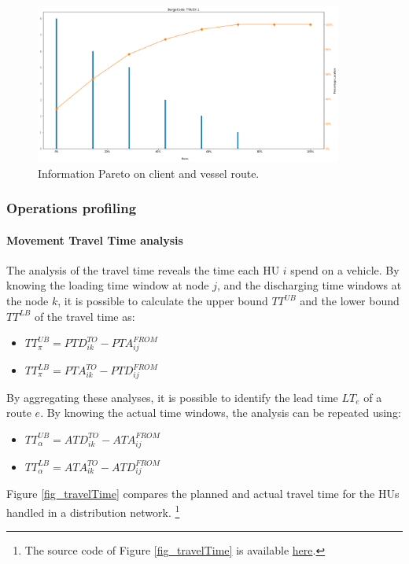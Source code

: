 \begin{figure}[hbt!]
\centering
\includegraphics[width=0.9\textwidth]{SectionDistribution/control_figures/fig_information.png}
\captionsetup{type=figure}
\caption{Information Pareto on client and vessel route.}
\label{fig_information}
\end{figure}

\subsubsection{Operations profiling} \label{secDistOperationsProfiling}
\paragraph{Movement Travel Time analysis}
The analysis of the travel time reveals the time each HU $i$ spend on a vehicle. By knowing the loading time window at node $j$, and the discharging time windows at the node $k$, it is possible to calculate the upper bound $TT^{UB}$ and the lower bound $TT^{LB}$ of the travel time as:
\begin{itemize}
    \item $	TT_\pi^{UB}=PTD_{ik}^{TO}-PTA_{ij}^{FROM}$
    \item $	TT_\pi^{LB}=PTA_{ik}^{TO}-PTD_{ij}^{FROM}$
\end{itemize}

By aggregating these analyses, it is possible to identify the lead time $LT_e$ of a route $e$. By knowing the actual time windows, the analysis can be repeated using:  
\begin{itemize}
    \item $TT_\alpha^{UB}=ATD_{ik}^{TO}-ATA_{ij}^{FROM}$
    \item $TT_\alpha^{LB}=ATA_{ik}^{TO}-ATD_{ij}^{FROM}$
\end{itemize}

Figure \ref{fig_travelTime} compares the planned and actual travel time for the HUs handled in a distribution network. \footnote{The source code of Figure \ref{fig_travelTime} is available \href{https://github.com/aletuf93/logproj/blob/master/examples/DIST_01\%20Supply\%20Chain\%20Assessment.ipynb}{here}.}

